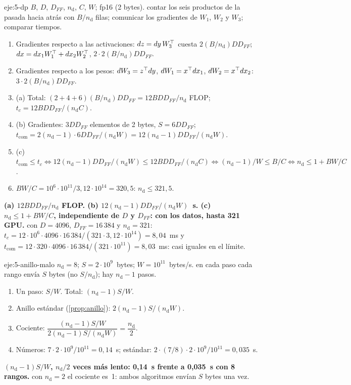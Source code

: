\begin{solucion}{eje:5-dp}
\datos $B$, $D$, $D_{FF}$, $n_{\mathrm{d}}$, $C$, $W$; fp16 (2 bytes).
\planteamiento contar los seis productos de la pasada hacia atrás con $B/n_{\mathrm{d}}$ filas; comunicar los gradientes de $W_1$, $W_2$ y $W_3$; comparar tiempos.
\pasos
\begin{enumerate}[label=\arabic*.]
  \item Gradientes respecto a las activaciones: $dz=dy\,W_3^{\top}$ cuesta $2(B/n_{\mathrm{d}})DD_{FF}$; $dx=dx_1W_1^{\top}+dx_2W_2^{\top}$, $2\cdot 2(B/n_{\mathrm{d}})DD_{FF}$.
  \item Gradientes respecto a los pesos: $dW_3=z^{\top} dy$, $dW_1=x^{\top} dx_1$, $dW_2=x^{\top} dx_2$: $3\cdot 2(B/n_{\mathrm{d}})DD_{FF}$.
  \item (a) Total: $(2+4+6)(B/n_{\mathrm{d}})DD_{FF}=12BDD_{FF}/n_{\mathrm{d}}$ FLOP; $t_c=12BDD_{FF}/(n_{\mathrm{d}}C)$.
  \item (b) Gradientes: $3DD_{FF}$ elementos de 2 bytes, $S=6DD_{FF}$; $t_{\mathrm{com}}=2(n_{\mathrm{d}}-1)\cdot 6DD_{FF}/(n_{\mathrm{d}}W)=12(n_{\mathrm{d}}-1)DD_{FF}/(n_{\mathrm{d}}W)$.
  \item (c) $t_{\mathrm{com}}\le t_c\iff 12(n_{\mathrm{d}}-1)DD_{FF}/(n_{\mathrm{d}}W)\le 12BDD_{FF}/(n_{\mathrm{d}}C)\iff(n_{\mathrm{d}}-1)/W\le B/C\iff n_{\mathrm{d}}\le 1+BW/C$.
  \item $BW/C=10^{6}\cdot 10^{11}/3{,}12\cdot 10^{14}=320{,}5$: $n_{\mathrm{d}}\le 321{,}5$.
\end{enumerate}
\resultado \textbf{(a) $12BDD_{FF}/n_{\mathrm{d}}$ FLOP. (b) $12(n_{\mathrm{d}}-1)DD_{FF}/(n_{\mathrm{d}}W)$~s. (c) $n_{\mathrm{d}}\le 1+BW/C$, independiente de $D$ y $D_{FF}$: con los datos, hasta 321 GPU.}
\comprobacion con $D=4096$, $D_{FF}=16\,384$ y $n_{\mathrm{d}}=321$: $t_c=12\cdot 10^{6}\cdot 4096\cdot 16\,384/(321\cdot 3{,}12\cdot 10^{14})=8{,}04$~ms y $t_{\mathrm{com}}=12\cdot 320\cdot 4096\cdot 16\,384/(321\cdot 10^{11})=8{,}03$~ms: casi iguales en el límite.
\end{solucion}

\begin{solucion}{eje:5-anillo-malo}
\datos $n_{\mathrm{d}}=8$; $S=2\cdot 10^{9}$~bytes; $W=10^{11}$~bytes/s.
\planteamiento en cada paso cada rango envía $S$ bytes (no $S/n_{\mathrm{d}}$); hay $n_{\mathrm{d}}-1$ pasos.
\pasos
\begin{enumerate}[label=\arabic*.]
  \item Un paso: $S/W$. Total: $(n_{\mathrm{d}}-1)S/W$.
  \item Anillo estándar (\cref{prop:anillo}): $2(n_{\mathrm{d}}-1)S/(n_{\mathrm{d}}W)$.
  \item Cociente: $\dfrac{(n_{\mathrm{d}}-1)S/W}{2(n_{\mathrm{d}}-1)S/(n_{\mathrm{d}}W)}=\dfrac{n_{\mathrm{d}}}{2}$.
  \item Números: $7\cdot 2\cdot 10^{9}/10^{11}=0{,}14$~s; estándar: $2\cdot(7/8)\cdot 2\cdot 10^{9}/10^{11}=0{,}035$~s.
\end{enumerate}
\resultado \textbf{$(n_{\mathrm{d}}-1)S/W$, $n_{\mathrm{d}}/2$ veces más lento: 0{,}14~s frente a 0{,}035~s con 8 rangos.}
\comprobacion con $n_{\mathrm{d}}=2$ el cociente es~1: ambos algoritmos envían $S$ bytes una vez.
\end{solucion}

